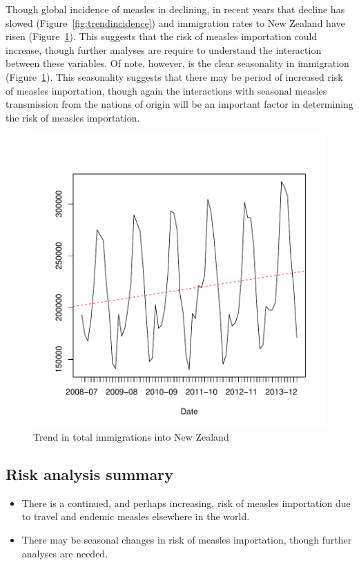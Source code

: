\documentclass{article}
\begin{document}
Though global incidence of measles in declining, in recent years that decline has slowed (Figure~\ref{fig:trendincidence}) and immigration rates to New Zealand have risen (Figure~\ref{fig:trendimmigration}). This suggests that the risk of measles importation could increase, though further analyses are require to understand the interaction between these variables.  Of note, however, is the clear seasonality in immigration (Figure~\ref{fig:trendimmigration}).  This seasonality suggests that there may be period of increased risk of measles importation, though again the interactions with seasonal measles transmission from the nations of origin will be an important factor in determining the risk of measles importation.

\begin{figure}[h!]
\begin{center}
\includegraphics{interimreport1-012}
\end{center}
\caption{Trend in total immigrations into New Zealand}
\label{fig:trendimmigration}
\end{figure}

\subsection{Risk analysis summary}
\begin{itemize}
\item There is a continued, and perhaps increasing, risk of measles importation due to travel and endemic measles elsewhere in the world.
\item There may be seasonal changes in risk of measles importation, though further analyses are needed.
\end{itemize}
\end{document}
